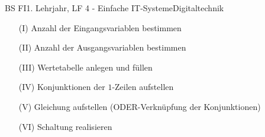 \documentclass[11pt,twocolumn,oneside,openany,headings=optiontotoc,11pt,numbers=noenddot]{article}
\begin{document}
\begin{worksheet}{BS FI}{1. Lehrjahr, LF 4 - Einfache IT-Systeme}{Digitaltechnik}
\begin{itemize}
			\item[(I)] Anzahl der Eingangsvariablen bestimmen
			\item[(II)] Anzahl der Ausgangsvariablen bestimmen
			\item[(III)] Wertetabelle anlegen und füllen
			\item[(IV)] Konjunktionen der \(1\)-Zeilen aufstellen
			\item[(V)] Gleichung aufstellen (ODER-Verknüpfung der Konjunktionen)
			\item[(VI)] Schaltung realisieren		
		\end{itemize}
	\end{worksheet}
\end{document}
